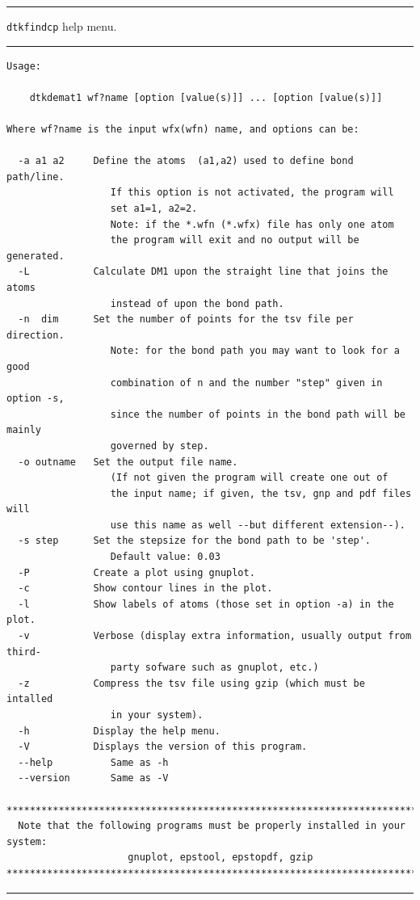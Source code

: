 \rule{\textwidth}{1pt}
{\center\texttt{dtkfindcp} help menu.\\}
\rule{\textwidth}{1pt}
\begin{footnotesize}
\begin{verbatim}
Usage:

	dtkdemat1 wf?name [option [value(s)]] ... [option [value(s)]]

Where wf?name is the input wfx(wfn) name, and options can be:

  -a a1 a2     Define the atoms  (a1,a2) used to define bond path/line.
                  If this option is not activated, the program will 
                  set a1=1, a2=2.
                  Note: if the *.wfn (*.wfx) file has only one atom
                  the program will exit and no output will be generated.
  -L           Calculate DM1 upon the straight line that joins the atoms
                  instead of upon the bond path.
  -n  dim      Set the number of points for the tsv file per direction.
                  Note: for the bond path you may want to look for a good 
                  combination of n and the number "step" given in option -s,
                  since the number of points in the bond path will be mainly 
                  governed by step.
  -o outname   Set the output file name.
                  (If not given the program will create one out of
                  the input name; if given, the tsv, gnp and pdf files will
                  use this name as well --but different extension--).
  -s step      Set the stepsize for the bond path to be 'step'.
                  Default value: 0.03
  -P           Create a plot using gnuplot.
  -c           Show contour lines in the plot.
  -l           Show labels of atoms (those set in option -a) in the plot.
  -v           Verbose (display extra information, usually output from third-
                  party sofware such as gnuplot, etc.)
  -z           Compress the tsv file using gzip (which must be intalled
                  in your system).
  -h           Display the help menu.
  -V           Displays the version of this program.
  --help          Same as -h
  --version       Same as -V

********************************************************************************
  Note that the following programs must be properly installed in your system:
                     gnuplot, epstool, epstopdf, gzip
********************************************************************************
\end{verbatim}
\end{footnotesize}
\rule{\textwidth}{1pt}

